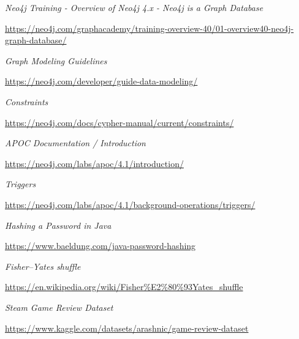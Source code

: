 \documentclass[12pt,a4paper]{report}
\begin{document}
\begin{thebibliography}{9}
  
  \textit{Neo4j Training - Overview of Neo4j 4.x - Neo4j is a Graph Database  }
  
  \url{https://neo4j.com/graphacademy/training-overview-40/01-overview40-neo4j-graph-database/}
  
  
  \textit{Graph Modeling Guidelines}
  
  \url{https://neo4j.com/developer/guide-data-modeling/}
  
  
  \textit{Constraints}
  
  \url{https://neo4j.com/docs/cypher-manual/current/constraints/}
  
  
  \textit{APOC Documentation / Introduction}
  
  \url{https://neo4j.com/labs/apoc/4.1/introduction/}
  
  
  \textit{Triggers}
  
  \url{https://neo4j.com/labs/apoc/4.1/background-operations/triggers/}
  
  
  \textit{Hashing a Password in Java}
  
  \url{https://www.baeldung.com/java-password-hashing}
  
  
  \textit{Fisher–Yates shuffle}
  
  \url{https://en.wikipedia.org/wiki/Fisher%E2%80%93Yates_shuffle}
  
  
  \textit{Steam Game Review Dataset}
  
  \url{https://www.kaggle.com/datasets/arashnic/game-review-dataset}

\end{thebibliography}
\end{document}
